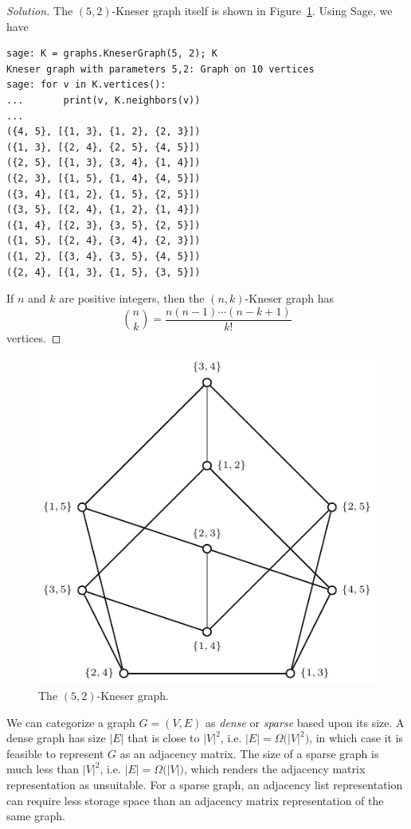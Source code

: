 \begin{proof}[Solution]
The $(5,2)$-Kneser graph itself is shown in
Figure~\ref{fig:graph_algorithms:5_2_Kneser_graph}. Using Sage, we
have
\begin{lstlisting}
sage: K = graphs.KneserGraph(5, 2); K
Kneser graph with parameters 5,2: Graph on 10 vertices
sage: for v in K.vertices():
...       print(v, K.neighbors(v))
...
({4, 5}, [{1, 3}, {1, 2}, {2, 3}])
({1, 3}, [{2, 4}, {2, 5}, {4, 5}])
({2, 5}, [{1, 3}, {3, 4}, {1, 4}])
({2, 3}, [{1, 5}, {1, 4}, {4, 5}])
({3, 4}, [{1, 2}, {1, 5}, {2, 5}])
({3, 5}, [{2, 4}, {1, 2}, {1, 4}])
({1, 4}, [{2, 3}, {3, 5}, {2, 5}])
({1, 5}, [{2, 4}, {3, 4}, {2, 3}])
({1, 2}, [{3, 4}, {3, 5}, {4, 5}])
({2, 4}, [{1, 3}, {1, 5}, {3, 5}])
\end{lstlisting}
If $n$ and $k$ are positive integers, then the
$(n,k)$-Kneser graph has
\[
\binom{n}{k}
=
\frac{n (n-1) \cdots (n - k + 1)} {k!}
\]
vertices.
\end{proof}

\begin{figure}[!htbp]
\centering
{}
\includegraphics{image/graph-algorithms/5-2-Kneser-graph}
\caption{The $(5,2)$-Kneser graph.}
\label{fig:graph_algorithms:5_2_Kneser_graph}
\end{figure}

We can categorize a graph $G = (V, E)$ as \emph{dense} or
\emph{sparse} based upon its size. A dense graph
has size $|E|$ that is close to $|V|^2$, i.e.
$|E| = \Omega\big(|V|^2\big)$, in which case it is feasible to
represent $G$ as an adjacency matrix. The size of a sparse
graph is much less than $|V|^2$, i.e.
$|E| = \Omega\big(|V|\big)$, which renders the adjacency
matrix representation as unsuitable. For a
sparse graph, an adjacency list representation
can require less storage space than an adjacency matrix representation
of the same graph.


